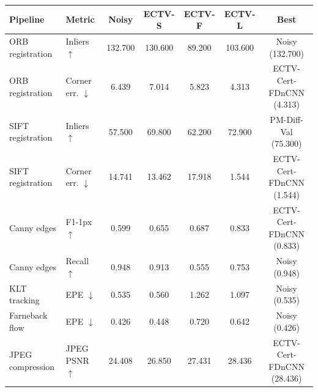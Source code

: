\begin{tabular}{lp{}ccccc}
\toprule
Pipeline & Metric & Noisy & ECTV-S & ECTV-F & ECTV-L & Best \\
\midrule
ORB registration & Inliers $\uparrow$ & 132.700 & 130.600 & 89.200 & 103.600 & Noisy (132.700) \\
ORB registration & Corner err. $\downarrow$ & 6.439 & 7.014 & 5.823 & 4.313 & ECTV-Cert-FDnCNN (4.313) \\
SIFT registration & Inliers $\uparrow$ & 57.500 & 69.800 & 62.200 & 72.900 & PM-Diff-Val (75.300) \\
SIFT registration & Corner err. $\downarrow$ & 14.741 & 13.462 & 17.918 & 1.544 & ECTV-Cert-FDnCNN (1.544) \\
Canny edges & F1-1px $\uparrow$ & 0.599 & 0.655 & 0.687 & 0.833 & ECTV-Cert-FDnCNN (0.833) \\
Canny edges & Recall $\uparrow$ & 0.948 & 0.913 & 0.555 & 0.753 & Noisy (0.948) \\
KLT tracking & EPE $\downarrow$ & 0.535 & 0.560 & 1.262 & 1.097 & Noisy (0.535) \\
Farneback flow & EPE $\downarrow$ & 0.426 & 0.448 & 0.720 & 0.642 & Noisy (0.426) \\
JPEG compression & JPEG PSNR $\uparrow$ & 24.408 & 26.850 & 27.431 & 28.436 & ECTV-Cert-FDnCNN (28.436) \\
\bottomrule
\end{tabular}
